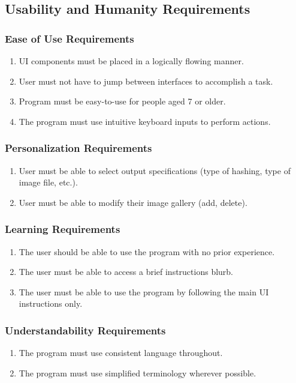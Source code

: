 \documentclass[12pt, titlepage]{article}
\begin{document}
\subsection{Usability and Humanity Requirements}
\subsubsection{Ease of Use Requirements}
\begin{enumerate}[label=UH\arabic*., series=uhs]
    \item UI components must be placed in a logically flowing manner.
    \item User must not have to jump between interfaces to accomplish a task.
    \item Program must be easy-to-use for people aged 7 or older.
    \item The program must use intuitive keyboard inputs to perform actions.
\end{enumerate}
                           
\subsubsection{Personalization Requirements}
\begin{enumerate}[label=UH\arabic*., resume=uhs]
    \item User must be able to select output specifications (type of hashing, type of image file, etc.).
    \item User must be able to modify their image gallery (add, delete).
\end{enumerate} 
\subsubsection{Learning Requirements} 
\begin{enumerate}[label=UH\arabic*., resume=uhs]
    \item The user should be able to use the program with no prior experience.
    \item The user must be able to access a brief instructions blurb.
    \item The user must be able to use the program by following the main UI instructions only.
\end{enumerate} 

\subsubsection{Understandability Requirements}
\begin{enumerate}[label=UH\arabic*., resume=uhs]
    \item The program must use consistent language throughout.
    \item The program must use simplified terminology wherever possible.
\end{enumerate}
\end{document}
